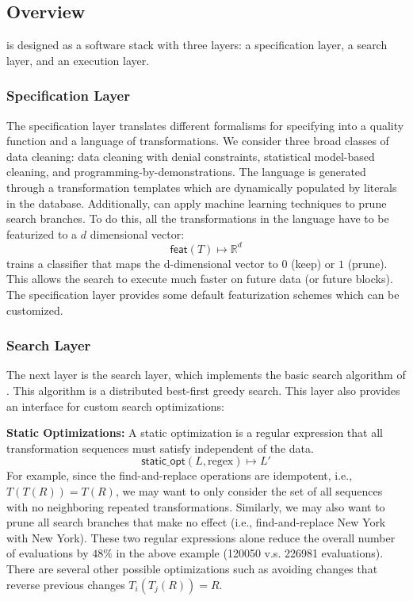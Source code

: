 \subsection{Overview}
\sys is designed as a software stack with three layers: a specification layer, a search layer, and an execution layer.

\subsubsection{Specification Layer} The specification layer translates different formalisms for specifying into a quality function and a language of transformations. We consider three broad classes of data cleaning: data cleaning with denial constraints, statistical model-based cleaning, and programming-by-demonstrations. The language is generated through a transformation templates which are dynamically populated by literals in the database. Additionally, \sys can apply machine learning techniques to prune search branches.
To do this, all the transformations in the language have to be featurized to a $d$ dimensional vector:
\[
\textsf{feat}(T) \mapsto \mathbb{R}^d
\]
\sys trains a classifier that maps the d-dimensional vector to $0$ (keep) or $1$ (prune).
This allows the search to execute much faster on future data (or future blocks).
The specification layer provides some default featurization schemes which can be customized.


\subsubsection{Search Layer} The next layer is the search layer, which implements the basic search algorithm of \sys. This algorithm is a distributed best-first greedy search.  This layer also provides an interface for custom search optimizations:

\vspace{0.5em}\noindent\textbf{Static Optimizations: } A static optimization is a regular expression that all transformation sequences must satisfy independent of the data. 
\[\textsf{static\_opt}(L, \text{regex} ) \mapsto L'\]
For example, since the find-and-replace operations are idempotent, i.e., $T(T(R)) = T(R)$, we may want to only consider the set of all sequences with no neighboring repeated transformations. Similarly, we may also want to prune all search branches that make no effect (i.e., find-and-replace New York with New York).
These two regular expressions alone reduce the overall number of evaluations by $48\%$ in the above example (120050 v.s. 226981 evaluations).
There are several other possible optimizations  such as avoiding changes that reverse previous changes $T_i(T_j(R)) = R$.


